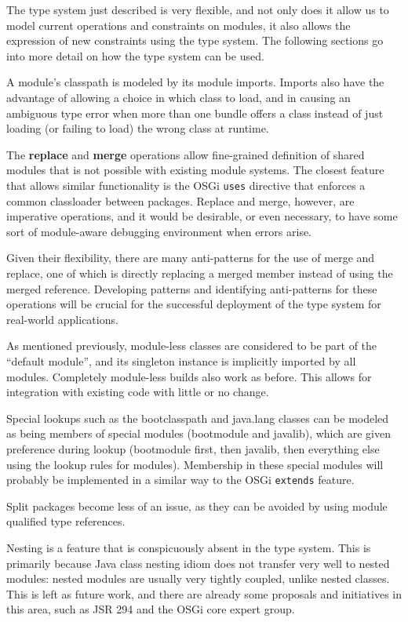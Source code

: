 The type system just described is very flexible, and not only does it
allow us to model current operations and constraints on modules, it also
allows the expression of new constraints using the type system. The following
sections go into more detail on how the type system can be used.


A module's classpath is modeled by its module imports. Imports also have the advantage
of allowing a choice in which class to load, and in causing an
ambiguous type error  when more than one bundle offers
a class instead of just loading (or failing to load) the wrong class at runtime.

The \textbf{replace} and \textbf{merge} operations allow fine-grained
definition of shared modules that is not possible with existing
module systems. The closest feature that allows similar functionality
is the OSGi \texttt{uses} directive that enforces a common classloader
between packages. Replace and merge, however, are imperative operations, and it would
be desirable, or even necessary, to have some sort of module-aware 
debugging environment when errors arise. 

Given their flexibility,
there are many anti-patterns for the use of merge and replace, one of which
is directly replacing a merged member instead of using the merged reference.
Developing patterns and identifying anti-patterns for these operations will be
crucial for the successful deployment of the type system for real-world applications.

As mentioned previously, module-less classes are considered to be part 
of the ``default module'', and its singleton instance is implicitly 
imported by all modules. Completely module-less builds also work as before.
This allows for integration with existing code with little or no change.

Special lookups such as the bootclasspath and java.lang classes can be
modeled as being members of special modules (bootmodule and javalib), 
which are given preference during lookup (bootmodule first, then javalib,
then everything else using the lookup rules for modules). Membership
in these special modules will probably be implemented in a similar way to
the OSGi \texttt{extends} feature.

Split packages become less of an issue, as they can be 
avoided by using module qualified type references.

Nesting is a feature that is conspicuously absent in the type system. This
is primarily because Java class nesting idiom does not transfer very well to
nested modules: nested modules are usually very tightly coupled, unlike nested
classes. This is left as future work, and there are already some proposals
and initiatives in this area, such as JSR 294 and the OSGi core expert group.

